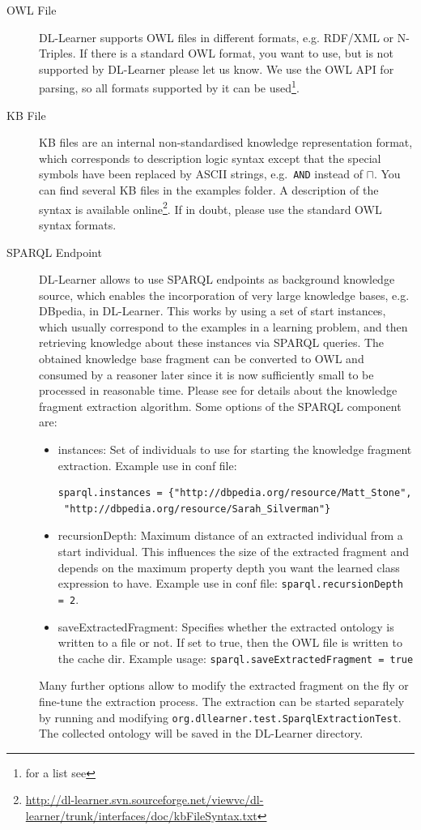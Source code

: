\documentclass[a4paper,12pt]{scrartcl}
\begin{document}
\begin{description}
 \item[OWL File] DL-Learner supports OWL files in different formats, e.g. RDF/XML or N-Triples. If there is a standard OWL format, you want to use, but is not supported by DL-Learner please let us know. We use the OWL API for parsing, so all formats supported by it can be used\footnote{ for a list see \owlapi}.
 \item[KB File] KB files are an internal non-standardised knowledge representation format, which corresponds to description logic syntax except that the special symbols have been replaced by ASCII strings, e.g.~\verb|AND| instead of $\sqcap$. You can find several KB files in the examples folder. A description of the syntax is available online\footnote{\url{http://dl-learner.svn.sourceforge.net/viewvc/dl-learner/trunk/interfaces/doc/kbFileSyntax.txt}}. If in doubt, please use the standard OWL syntax formats.
 \item[SPARQL Endpoint] DL-Learner allows to use SPARQL endpoints as background knowledge source, which enables the incorporation of very large knowledge bases, e.g. DBpedia\cite{2008_dbpedia}, in DL-Learner. This works by using a set of start instances, which usually correspond to the examples in a learning problem, and then retrieving knowledge about these instances via SPARQL queries. The obtained knowledge base fragment can be converted to OWL and consumed by a reasoner later since it is now sufficiently small to be processed in reasonable time. Please see \cite{2009_ijswis} for details about the knowledge fragment extraction algorithm. Some options of the SPARQL component are:
\begin{itemize}
 \item instances: Set of individuals to use for starting the knowledge fragment extraction. Example use in conf file: \begin{verbatim}sparql.instances = {"http://dbpedia.org/resource/Matt_Stone",
 "http://dbpedia.org/resource/Sarah_Silverman"}\end{verbatim}
 \item recursionDepth: Maximum distance of an extracted individual from a start individual. This influences the size of the extracted fragment and depends on the maximum property depth you want the learned class expression to have. Example use in conf file: \verb|sparql.recursionDepth = 2|.
\item saveExtractedFragment: Specifies whether the extracted ontology is written to a file or not. If set to true, then the OWL file is written to the cache dir. Example usage: \verb|sparql.saveExtractedFragment = true|
\end{itemize}
 Many further options allow to modify the extracted fragment on the fly or fine-tune the extraction process.
The extraction can be started separately by running and modifying \verb|org.dllearner.test.SparqlExtractionTest|. The collected ontology will be saved in the DL-Learner directory.
\end{description}
\end{document}

